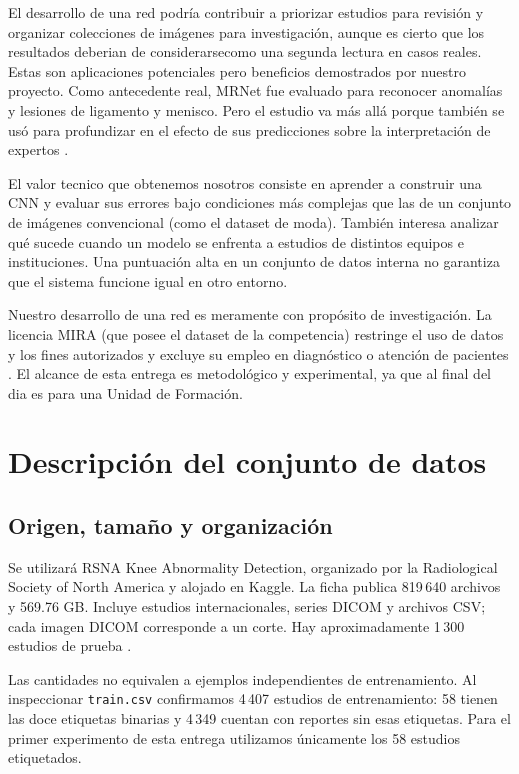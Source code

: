 \documentclass[eng]{ajceam-class}
\begin{document}
El desarrollo de una red podría contribuir a priorizar estudios para revisión y organizar colecciones de imágenes para investigación, aunque es cierto que los resultados deberian de considerarsecomo una segunda lectura en casos reales. Estas son aplicaciones potenciales pero beneficios demostrados por nuestro proyecto. Como antecedente real, MRNet fue evaluado para reconocer anomalías y lesiones de ligamento y menisco. Pero el estudio va más allá porque también se usó para profundizar en el efecto de sus predicciones sobre la interpretación de expertos \cite{bien2018}.

El valor tecnico que obtenemos nosotros consiste en aprender a construir una CNN y evaluar sus errores bajo condiciones más complejas que las de un conjunto de imágenes convencional (como el dataset de moda). También interesa analizar qué sucede cuando un modelo se enfrenta a estudios de distintos equipos e instituciones. Una puntuación alta en un conjunto de datos interna no garantiza que el sistema funcione igual en otro entorno.

Nuestro desarrollo de una red es meramente con propósito de investigación. La licencia MIRA (que posee el dataset de la competencia) restringe el uso de datos y los fines autorizados y excluye su empleo en diagnóstico o atención de pacientes \cite{mira}. El alcance de esta entrega es metodológico y experimental, ya que al final del dia es para una Unidad de Formación.

\section{Descripción del conjunto de datos}

\subsection{Origen, tamaño y organización}

Se utilizará RSNA Knee Abnormality Detection, organizado por la Radiological Society of North America y alojado en Kaggle. La ficha publica 819\,640 archivos y 569.76 GB. Incluye estudios internacionales, series DICOM y archivos CSV; cada imagen DICOM corresponde a un corte. Hay aproximadamente 1\,300 estudios de prueba \cite{rsnadata}.

Las cantidades no equivalen a ejemplos independientes de entrenamiento. Al inspeccionar \texttt{train.csv} confirmamos 4\,407 estudios de entrenamiento: 58 tienen las doce etiquetas binarias y 4\,349 cuentan con reportes sin esas etiquetas. Para el primer experimento de esta entrega utilizamos únicamente los 58 estudios etiquetados.
\end{document}
